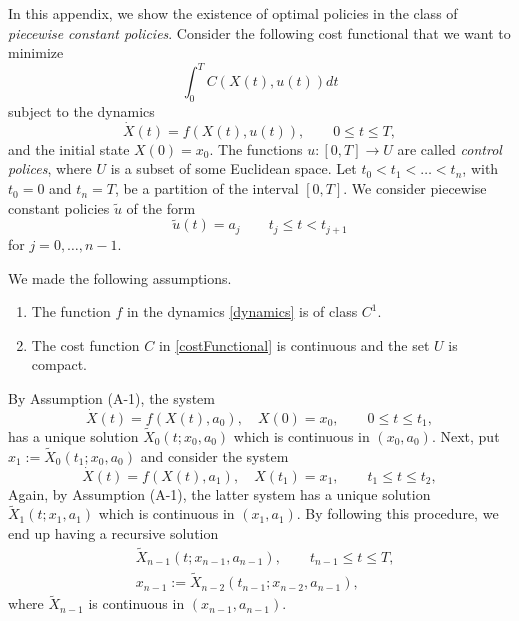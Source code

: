 In this appendix, we show the existence of optimal policies in the class of
{\it piecewise constant policies}. Consider the following cost functional that
we want to minimize
\begin{equation}\label{costFunctional}
  \int_0^T C(X(t),u(t)) dt
\end{equation}
subject to the dynamics
\begin{equation}\label{dynamics}
  \dot{X}(t) = f(X(t),u(t)),  \qquad    0\leq t \leq T,
\end{equation}
and the initial state $X(0)=x_0$. The functions $u:[0,T]\to U$ are called {\it
control polices}, where $U$ is a subset of some Euclidean space.
%
Let $t_0<t_1<\ldots <t_n$, with
$t_0=0$ and $t_n=T$, be a partition of the interval $[0,T]$.
We consider piecewise constant policies $\tilde{u}$ of the form
\begin{equation}\label{PieceConstCont}
  \tilde{u}(t) = a_j\qquad t_j\leq t < t_{j+1}
\end{equation}
 for $j=0,\ldots,n-1$.
\begin{assumptions}
    We made the following assumptions.
    \begin{enumerate}[({A}-1)]
        \item
            The function $f$ in the dynamics \eqref{dynamics} is of
            class $C^1$.
        \item
            The cost function $C$ in \eqref{costFunctional} is continuous and
            the set $U$ is compact.
    \end{enumerate}
\end{assumptions}
%

    By Assumption (A-1)\textbf{}, the system
\[
  \dot{X}(t) = f(X(t),a_0), \quad X(0)=x_0, \qquad    0\leq t \leq t_1,
\]
has a unique solution $\tilde{X}_0(t;x_0,a_0)$ which is continuous in
$(x_0,a_0)$.  Next, put $x_1:=\tilde{X}_0(t_1;x_0,a_0)$ and consider the system
\[
  \dot{X}(t) = f(X(t),a_1), \quad X(t_1)=x_1, \qquad    t_1\leq t \leq t_2,
\]
Again, by Assumption (A-1), the latter system has a unique solution
$\tilde{X}_1(t;x_1,a_1)$ which is
continuous in $(x_1,a_1)$. By following this procedure, we end up having a
recursive solution
\begin{equation*}
  \begin{aligned}
    & \tilde{X}_{n-1}(t;x_{n-1},a_{n-1}),
    \qquad t_{n-1}\leq t \leq T,\\
    & x_{n-1}:=\tilde{X}_{n-2}(t_{n-1};x_{n-2},a_{n-1}),
  \end{aligned}
\end{equation*}
where $\tilde{X}_{n-1}$ is continuous in $(x_{n-1},a_{n-1})$.


